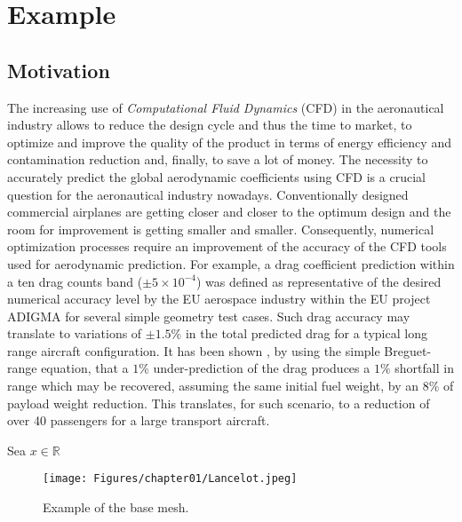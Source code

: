 \chapter[Puedo poner otra cosa]{Example}
\label{chap:Example}

\minitoc




\section{Motivation}
\label{sec:101}

The increasing use of {\em Computational Fluid Dynamics} (CFD) in the aeronautical
industry allows to reduce the design cycle and thus the time to market, to optimize
and improve the quality of the product in terms of energy efficiency and contamination
reduction and, finally, to save a lot of money. The necessity to accurately predict
the global aerodynamic coefficients using CFD is a crucial question for the aeronautical
industry nowadays. Conventionally designed commercial airplanes are getting closer and
closer to the optimum design and the room for improvement is getting smaller and smaller.
Consequently, numerical optimization processes require an improvement of the accuracy of
the CFD tools used for aerodynamic prediction. For example, a drag coefficient prediction
within a ten drag counts band ($\pm 5\times 10^{-4}$) was defined as representative of the
desired numerical accuracy level by the EU aerospace industry within the EU project ADIGMA
\cite{Kroll_etal_2009} for several simple geometry test cases. Such drag accuracy may
translate to variations of $\pm 1.5\%$ in the total predicted drag for a typical long range
aircraft configuration. It has been shown \cite{Vassberg_etal_2003}, by using the simple
Breguet-range equation, that a $1\%$ under-prediction of the drag produces a $1\%$ shortfall
in range which may be recovered, assuming the same initial fuel weight, by an $8\%$ of payload
weight reduction. This translates, for such scenario, to a reduction of over 40 passengers
for a large transport aircraft. 

Sea $x \in \mathbb{R}$

\begin{figure}
     \begin{center}
           \texttt{[image: Figures/chapter01/Lancelot.jpeg]}
    \end{center}
\caption{Example of the base mesh.}
\label{fig:201}
\end{figure}


